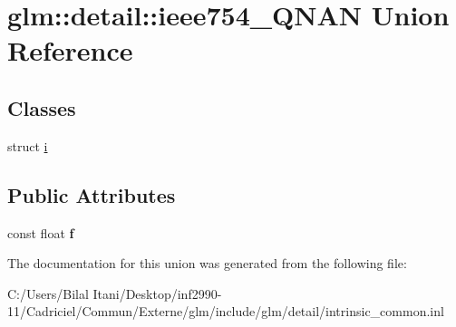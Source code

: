 \hypertarget{unionglm_1_1detail_1_1ieee754___q_n_a_n}{}\section{glm\+:\+:detail\+:\+:ieee754\+\_\+\+Q\+N\+AN Union Reference}
\label{unionglm_1_1detail_1_1ieee754___q_n_a_n}
\subsection*{Classes}
\begin{DoxyCompactItemize}
\item 
struct \hyperlink{structglm_1_1detail_1_1ieee754___q_n_a_n_1_1i}{i}
\end{DoxyCompactItemize}
\subsection*{Public Attributes}
\begin{DoxyCompactItemize}
\item 
const float {\bfseries f}\hypertarget{unionglm_1_1detail_1_1ieee754___q_n_a_n_ac5f04f4e605e4d08ddc2bacddf7eee65}{}\label{unionglm_1_1detail_1_1ieee754___q_n_a_n_ac5f04f4e605e4d08ddc2bacddf7eee65}

\end{DoxyCompactItemize}


The documentation for this union was generated from the following file\+:\begin{DoxyCompactItemize}
\item 
C\+:/\+Users/\+Bilal Itani/\+Desktop/inf2990-\/11/\+Cadriciel/\+Commun/\+Externe/glm/include/glm/detail/intrinsic\+\_\+common.\+inl\end{DoxyCompactItemize}
